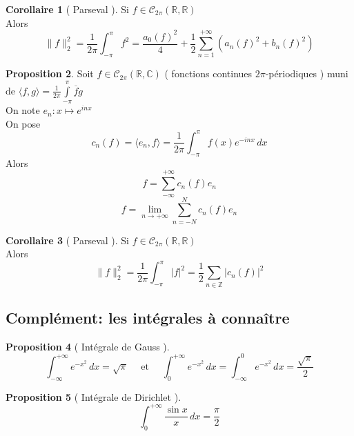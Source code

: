 \documentclass[10pt,a4paper]{article}
\theoremstyle{definition}
\newtheorem{proposition}{Proposition}[section]
\newtheorem{corollary}[proposition]{Corollaire}
\begin{document}
\pagebreak

\begin{corollary}[ Parseval ]
    Si \(f \in \mathcal{C}_{2\pi}(\mathbb{R}, \mathbb{R})\) \\
    Alors \[\boxed{\lVert f \rVert_2^2 = \frac{1}{2\pi}\int_{-\pi}^{\pi} f^2 = \frac{a_0(f)^2}{4} + \frac{1}{2} \sum_{n = 1}^{+\infty}\left(a_n(f)^2 + b_n(f)^2 \right)}\]
\end{corollary}
\begin{proposition}
    Soit \(f \in \mathcal{C}_{2\pi}(\mathbb{R}, \mathbb{C})\) ( fonctions continues \(2\pi\)-périodiques ) muni de \(\langle f, g \rangle = \frac{1}{2\pi}\int\limits_{-\pi}^{\pi}\overline{f}g\) \\
    On note \(e_n: x \mapsto e^{inx}\) \\
    On pose \[c_n(f) = \langle e_n, f \rangle = \frac{1}{2\pi} \int_{-\pi}^{\pi} f(x) e^{-inx} \,dx\]
    Alors \[\boxed{f = \sum_{-\infty}^{+\infty} c_n(f) e_n}\]
    \[ f = \lim_{n \to +\infty} \sum_{n = -N}^{N} c_n(f) e_n\]
\end{proposition}
\begin{corollary}[ Parseval ]
    Si \(f \in \mathcal{C}_{2\pi}(\mathbb{R}, \mathbb{R})\) \\
    Alors \[\boxed{\lVert f \rVert_2^2 = \frac{1}{2\pi}\int_{-\pi}^{\pi} |f|^2 = \frac{1}{2} \sum_{n \in \mathbb{Z}}|c_n(f)|^2}\]
\end{corollary}

\subsection{Complément: les intégrales à connaître}
\begin{proposition}[ Intégrale de Gauss ]
    \[\boxed{\int_{-\infty}^{+\infty} e^{-x^2} \,dx = \sqrt{\pi}} \quad \text{ et } \quad \boxed{\int_{0}^{+\infty} e^{-x^2} \,dx =  \int_{-\infty}^{0} e^{-x^2} \,dx = \frac{\sqrt{\pi}}{2}}\]
\end{proposition}
\begin{proposition}[ Intégrale de Dirichlet ]
    \[\boxed{\int_{0}^{+\infty} \frac{\sin x}{x} \,dx = \frac{\pi}{2}}\]
\end{proposition}
\end{document}
